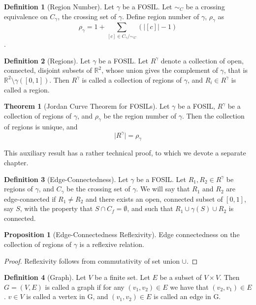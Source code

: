\documentclass{article}
\theoremstyle{definition}
\newtheorem{definition}{Definition}
\theoremstyle{proposition}
\newtheorem{proposition}{Proposition}
\theoremstyle{theorem}
\newtheorem{theorem}{Theorem}
\begin{document}
\begin{definition}[Region Number]
Let $\gamma$ be a FOSIL. Let $\sim_{C}$ be a crossing equivalence on $C_{\gamma}$, the crossing set of $\gamma$. Define region number of $\gamma$, $\rho_{\gamma}$ as $$\rho_{\gamma} = 1 + \sum_{[c]\in C_{\gamma}/\sim_{C}}{(\lvert[c]\rvert - 1)}$$.
\end{definition}

\begin{definition}[Regions]
Let $\gamma$ be a FOSIL. Let $R^{\gamma}$ denote a collection of open, connected, disjoint subsets of $\mathbb{R}^{2}$, whose union gives the complement of $\gamma$, that is $\mathbb{R}^{2}\setminus\gamma([0,1])$. Then $R^{\gamma}$ is called a collection of regions of $\gamma$, and $R_{i} \in R^{\gamma}$ is called a region.
\end{definition}

\begin{theorem}[Jordan Curve Theorem for FOSILs]
Let $\gamma$ be a FOSIL, $R^{\gamma}$ be a collection of regions of $\gamma$, and $\rho_{\gamma}$ be the region number of $\gamma$. Then the collection of regions is unique, and $$\lvert R^{\gamma}\rvert = \rho_{\gamma}$$
\end{theorem}

This auxiliary result has a rather technical proof, to which we devote a separate chapter.

\begin{definition}[Edge-Connectedness]
Let $\gamma$ be a FOSIL. Let $R_{1}, R_{2} \in R^{\gamma}$ be regions of $\gamma$, and $C_{\gamma}$ be the crossing set of $\gamma$. We will say that $R_{1}$ and $R_{2}$ are edge-connected if $R_{1} \neq R_{2}$ and there exists an open, connected subset of $[0, 1]$, say $S$, with the property that $S \cap C_{f} = \emptyset$, and such that $R_{1} \cup \gamma(S) \cup R_{2}$ is connected.
\end{definition}

\begin{proposition}[Edge-Connectedness Reflexivity]
Edge connectedness on the collection of regions of $\gamma$ is a reflexive relation.
\end{proposition}

\begin{proof}
Reflexivity follows from commutativity of set union $\cup$.
\end{proof}

\begin{definition}[Graph]
Let $V$ be a finite set. Let $E$ be a subset of $V\times V$. Then $G=(V, E)$ is called a graph if for any $(v_{1}, v_{2}) \in E$ we have that $(v_{2}, v_{1}) \in E$. $v \in V$ is called a vertex in G, and $(v_{1}, v_{2}) \in E$ is called an edge in G.
\end{definition}
\end{document}
